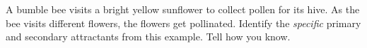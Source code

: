
\showpoints

\question[4]
A bumble bee visits a bright yellow sunflower to collect pollen for its hive. As the bee visits different flowers, the flowers get pollinated. Identify the \textit{specific} primary and secondary attractants from this example. Tell how you know.

